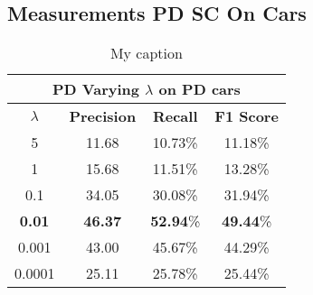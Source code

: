 \subsection{Measurements PD SC On Cars}
\begin{table}[H]
\centering
\begin{tabular}{|c|c|c|c|}
\hline
\multicolumn{4}{|c|}{PD Varying $\lambda$ on PD cars}                        \\ \hline
$\lambda$ & \textbf{Precision} & \textbf{Recall} & \textbf{F1 Score} \\ \hline
5 & 11.68 & 10.73\% & 11.18\%  \\ \hline
1 & 15.68 & 11.51\% & 13.28\%  \\ \hline
0.1 & 34.05 & 30.08\% & 31.94\%  \\ \hline
\textbf{0.01} & \textbf{46.37} & \textbf{52.94}\% & \textbf{49.44}\%  \\ \hline
0.001 & 43.00 & 45.67\% & 44.29\%  \\ \hline
0.0001 & 25.11 & 25.78\% & 25.44\%  \\ \hline
\end{tabular}
\caption[Cars Varying $\lambda$]{My caption}
\label{tab:cars_varying_lambas}
\end{table}

